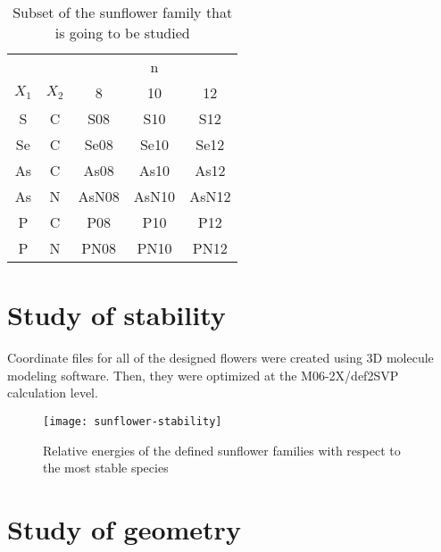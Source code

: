 \begin{table}
    \centering
    \caption[Sunflowers in this study]{Subset of the sunflower family that is going to be studied}
    \begin{tabular}{@{}ccccc@{}}
        \toprule
        && \multicolumn{3}{c}{n} \\
        $X_1$ & $X_2$ & 8 & 10 & 12 \\
        \midrule
        S & C & S08 & S10 & S12 \\
        Se & C & Se08 & Se10 & Se12 \\
        As & C & As08 & As10 & As12 \\
        As & N & AsN08 & AsN10 & AsN12 \\
        P & C & P08 & P10 & P12 \\
        P & N & PN08 & PN10 & PN12 \\
        \bottomrule
    \end{tabular}
\end{table}

\section{Study of stability}

Coordinate files for all of the designed flowers were created using 3D molecule modeling software.
Then, they were optimized at the M06-2X/def2SVP calculation level.

\blindtext

\begin{figure}
    \centering
    \texttt{[image: sunflower-stability]}
    \caption[Stability of sunflower families]{Relative energies of the defined sunflower families with respect to the most stable species}
\end{figure}


\section{Study of geometry}

\blindtext[5]


